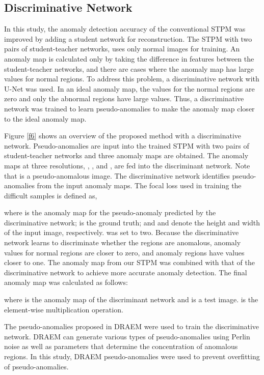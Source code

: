 \documentclass[letterpaper, 10 pt, conference]{ieeeconf}
\begin{document}
\subsection{Discriminative Network}


In this study, the anomaly detection accuracy of the conventional STPM was improved by adding a student network for reconstruction. The STPM with two pairs of student-teacher networks, uses only normal images for training. An anomaly map is calculated only by taking the difference in features between the student-teacher networks, and there are cases where the anomaly map has large values for normal regions. To address this problem, a discriminative network with U-Net was used. In an ideal anomaly map, the values for the normal regions are zero and only the abnormal regions have large values. Thus, a discriminative network was trained to learn pseudo-anomalies to make the anomaly map  closer to the ideal anomaly map. 

Figure \ref{f6} shows an overview of the proposed method with a discriminative network. Pseudo-anomalies are input into the trained STPM with two pairs of student-teacher networks and three anomaly maps are obtained. The anomaly maps at three resolutions, , , and , are fed into the discriminant network. Note that  is a pseudo-anomalous image. The discriminative network identifies pseudo-anomalies from the input anomaly maps. The focal loss used in training the difficult samples is defined as,

where  is the anomaly map for the pseudo-anomaly predicted by the discriminative network;  is the ground truth; and  and  denote the height and width of the input image, respectively.  was set to two. Because the discriminative network learns to discriminate whether the regions are anomalous, anomaly values for normal regions are closer to zero, and anomaly regions have values closer to one. The anomaly map from our STPM was combined with that of the discriminative network to achieve more accurate anomaly detection. The final anomaly map was calculated as follows:

where  is the anomaly map of the discriminant network and  is a test image.  is the element-wise multiplication operation.

The pseudo-anomalies proposed in DRAEM\cite{c38} were used to train the discriminative network. DRAEM can generate various types of pseudo-anomalies using Perlin noise\cite{c39} as well as parameters that determine the concentration of anomalous regions. In this study, DRAEM pseudo-anomalies were used to prevent overfitting of pseudo-anomalies.
\end{document}
